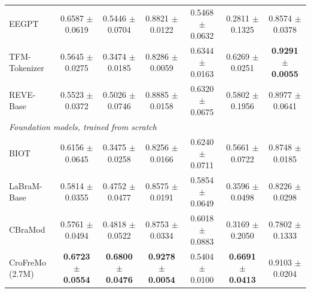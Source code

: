 \begin{table}[t]
{\begin{tabular}{lcccccc}
EEGPT & 0.6587 $\pm$ 0.0619 & 0.5446 $\pm$ 0.0704 & 0.8821 $\pm$ 0.0122 & 0.5468 $\pm$ 0.0632 & 0.2811 $\pm$ 0.1325 & 0.8574 $\pm$ 0.0378 \\
TFM-Tokenizer & 0.5645 $\pm$ 0.0275 & 0.3474 $\pm$ 0.0185 & 0.8286 $\pm$ 0.0059 & 0.6344 $\pm$ 0.0163 & 0.6269 $\pm$ 0.0251 & \textbf{0.9291 $\pm$ 0.0055} \\
REVE-Base & 0.5523 $\pm$ 0.0372 & 0.5026 $\pm$ 0.0746 & 0.8885 $\pm$ 0.0158 & 0.6320 $\pm$ 0.0675 & 0.5802 $\pm$ 0.1956 & 0.8977 $\pm$ 0.0641 \\
\midrule
\multicolumn{7}{l}{\textit{Foundation models, trained from scratch}} \\
BIOT & 0.6156 $\pm$ 0.0645 & 0.3475 $\pm$ 0.0258 & 0.8256 $\pm$ 0.0166 & 0.6240 $\pm$ 0.0711 & 0.5661 $\pm$ 0.0722 & 0.8748 $\pm$ 0.0185 \\
LaBraM-Base & 0.5814 $\pm$ 0.0355 & 0.4752 $\pm$ 0.0477 & 0.8575 $\pm$ 0.0191 & 0.5854 $\pm$ 0.0649 & 0.3596 $\pm$ 0.0498 & 0.8226 $\pm$ 0.0298 \\
CBraMod & 0.5761 $\pm$ 0.0494 & 0.4818 $\pm$ 0.0522 & 0.8753 $\pm$ 0.0334 & 0.6018 $\pm$ 0.0883 & 0.3169 $\pm$ 0.2050 & 0.7802 $\pm$ 0.1333 \\
\midrule
CroFreMo (2.7M) & \textbf{0.6723 $\pm$ 0.0554} & \textbf{0.6800 $\pm$ 0.0476} & \textbf{0.9278 $\pm$ 0.0054} & 0.5404 $\pm$ 0.0100 & \textbf{0.6691 $\pm$ 0.0413} & 0.9103 $\pm$ 0.0204 \\
\bottomrule
\end{tabular}}
\end{table}

